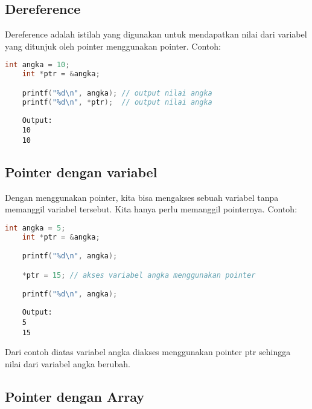 \subsection{Dereference}

Dereference adalah istilah yang digunakan untuk mendapatkan nilai dari variabel yang ditunjuk oleh pointer menggunakan pointer.
Contoh:
\begin{lstlisting}[language=c]
	int angka = 10;
	int *ptr = &angka;

	printf("%d\n", angka); // output nilai angka
	printf("%d\n", *ptr);  // output nilai angka
\end{lstlisting}
\begin{verbatim}
	Output:
	10
	10
\end{verbatim}

\subsection{Pointer dengan variabel}

Dengan menggunakan pointer, kita bisa mengakses sebuah variabel tanpa memanggil variabel tersebut.
Kita hanya perlu memanggil pointernya.
Contoh:
\begin{lstlisting}[language=c]
	int angka = 5;
	int *ptr = &angka;

	printf("%d\n", angka);

	*ptr = 15; // akses variabel angka menggunakan pointer

	printf("%d\n", angka);  
\end{lstlisting}
\begin{verbatim}
    Output:
    5
    15
\end{verbatim}
Dari contoh diatas variabel angka diakses menggunakan pointer ptr sehingga nilai dari variabel angka berubah.

\subsection{Pointer dengan Array}

